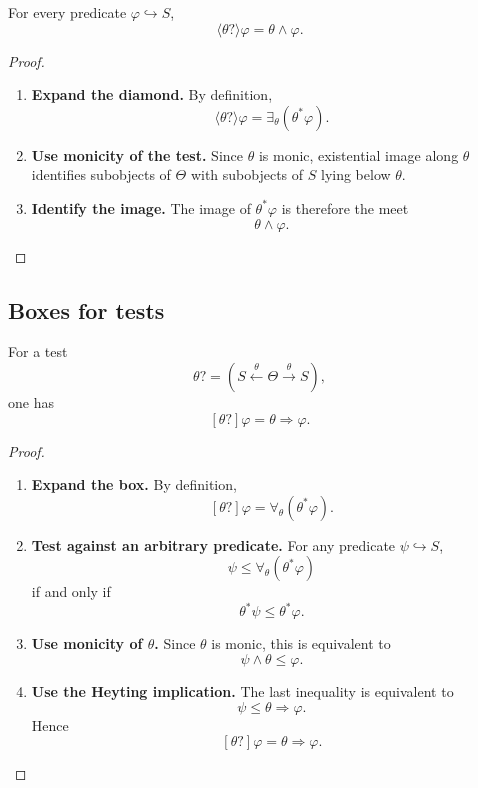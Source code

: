 \begin{proposition}
\label{prop:relative-test-diamond}
For every predicate \(\varphi\hookrightarrow S\),
\[
\langle\theta?\rangle\varphi
=
\theta\wedge\varphi.
\]
\end{proposition}

\begin{proof}
\leavevmode
\begin{enumerate}
\item \textbf{Expand the diamond.}
By definition,
\[
\langle\theta?\rangle\varphi
=
\exists_\theta(\theta^\ast\varphi).
\]

\item \textbf{Use monicity of the test.}
Since \(\theta\) is monic, existential image along \(\theta\) identifies
subobjects of \(\Theta\) with subobjects of \(S\) lying below \(\theta\).

\item \textbf{Identify the image.}
The image of \(\theta^\ast\varphi\) is therefore the meet
\[
\theta\wedge\varphi.
\]
\end{enumerate}
\end{proof}


\subsection{Boxes for tests}
\label{subsec:relative-boxes-tests}

\begin{proposition}
\label{prop:relative-test-box}
For a test
\[
\theta?=(S\xleftarrow{\theta}\Theta\xrightarrow{\theta}S),
\]
one has
\[
[\theta?]\varphi
=
\theta\Rightarrow\varphi.
\]
\end{proposition}

\begin{proof}
\leavevmode
\begin{enumerate}
\item \textbf{Expand the box.}
By definition,
\[
[\theta?]\varphi
=
\forall_\theta(\theta^\ast\varphi).
\]

\item \textbf{Test against an arbitrary predicate.}
For any predicate \(\psi\hookrightarrow S\),
\[
\psi\le \forall_\theta(\theta^\ast\varphi)
\]
if and only if
\[
\theta^\ast\psi\le \theta^\ast\varphi.
\]

\item \textbf{Use monicity of \(\theta\).}
Since \(\theta\) is monic, this is equivalent to
\[
\psi\wedge\theta\le\varphi.
\]

\item \textbf{Use the Heyting implication.}
The last inequality is equivalent to
\[
\psi\le\theta\Rightarrow\varphi.
\]
Hence
\[
[\theta?]\varphi=\theta\Rightarrow\varphi.
\]
\end{enumerate}
\end{proof}


